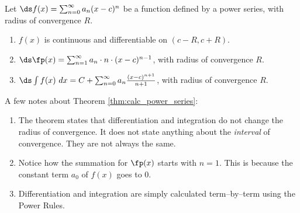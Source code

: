 {Let $\ds f(x) = \sum_{n=0}^\infty a_n(x-c)^n$ be a function defined by a power series, with radius of convergence $R$.
	\begin{enumerate}
		\item $f(x)$ is continuous and differentiable on $(c-R,c+R)$.
		\item	$\ds \fp(x) = \sum_{n=1}^\infty a_n\cdot n\cdot (x-c)^{n-1}$, with radius of convergence $R$.
		\item	$\ds \int f(x)\ dx = C+\sum_{n=0}^\infty a_n\frac{(x-c)^{n+1}}{n+1}$, with radius of convergence $R$.
	\end{enumerate}
}

A few notes about Theorem \ref{thm:calc_power_series}:
		\begin{enumerate}
			\item The theorem states that differentiation and integration do not change the radius of convergence. It does not state anything about the \emph{interval} of convergence. They are not always the same.
			\item		Notice how the summation for $\fp(x)$ starts with $n=1$. This is because the constant term $a_0$ of $f(x)$ goes to 0.
			\item	Differentiation and integration are simply calculated term--by--term using the Power Rules.
		\end{enumerate}

